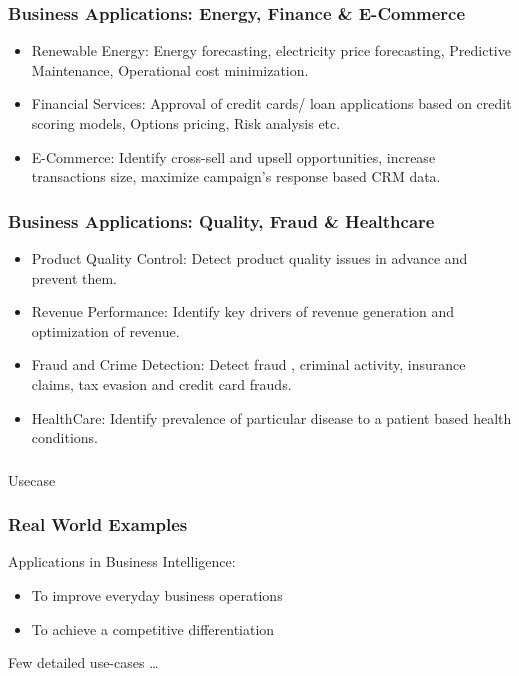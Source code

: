 \begin{frame}\frametitle{Business Applications: Energy, Finance \& E-Commerce}
\begin{itemize}
\item Renewable Energy:
Energy forecasting, electricity price forecasting, Predictive
Maintenance, Operational cost minimization.
\item Financial Services:
Approval of credit cards/ loan applications based on credit scoring
models, Options pricing, Risk analysis etc.
\item E-Commerce:
Identify cross-sell and upsell opportunities, increase transactions
size, maximize campaign's response based CRM data.
\end{itemize}
\end{frame}

\begin{frame}\frametitle{Business Applications: Quality, Fraud \& Healthcare}
\begin{itemize}
\item Product Quality Control:
Detect product quality issues in advance and prevent them.
\item Revenue Performance:
Identify key drivers of revenue generation and optimization of
revenue.
\item Fraud and Crime Detection:
Detect fraud , criminal activity, insurance claims, tax evasion and
credit card frauds.
\item HealthCare:
Identify prevalence of particular disease to a patient based health
conditions.

\end{itemize}
\end{frame}


\begin{frame}[fragile]\frametitle{}
\begin{center}
{\Large Usecase}
\end{center}
\end{frame}



\begin{frame}\frametitle{Real World Examples}
Applications in Business Intelligence:
\begin{itemize}
\item To improve everyday business operations
\item To achieve a competitive differentiation
\end{itemize}

Few detailed use-cases \ldots
\end{frame}


